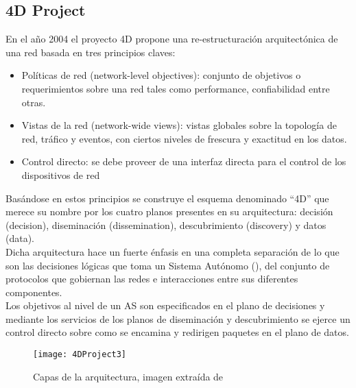 \subsection{4D Project}
En el año 2004 el proyecto 4D \citep{rexford2004network}\citep{greenberg2005clean} propone una re-estructuración arquitectónica de una red basada en tres principios claves: 

\begin{itemize}
\item Políticas de red (network-level objectives): conjunto de objetivos o requerimientos sobre una red tales como performance, confiabilidad entre otras.

\item Vistas de la red (network-wide views): vistas globales sobre la topolog\'ia de red, tr\'afico y eventos, con ciertos niveles de frescura y exactitud en los datos.

\item Control directo: se debe proveer de una interfaz directa para el control de los dispositivos de red
\end{itemize}

Basándose en estos principios se construye el esquema denominado ``4D'' que merece su nombre por los cuatro planos presentes en su arquitectura: decisión (decision), diseminación (dissemination), descubrimiento (discovery) y datos (data).\\

Dicha arquitectura hace un fuerte énfasis en una completa separación de lo que son las decisiones lógicas que toma un Sistema Autónomo (), del conjunto de protocolos que gobiernan las redes e interacciones entre sus diferentes componentes.\\

Los objetivos al nivel de un AS son especificados en el plano de decisiones y mediante los servicios de los planos de diseminación y descubrimiento se ejerce un control directo sobre como se encamina y redirigen paquetes en el plano de datos.\\

\begin{figure}[htbp!] 
\centering    
\texttt{[image: 4DProject3]}
\caption[Capas de la arquitectura]{Capas de la arquitectura, imagen extraída de \cite{greenberg2005clean}}
\label{fig:4DProject}
\end{figure}


